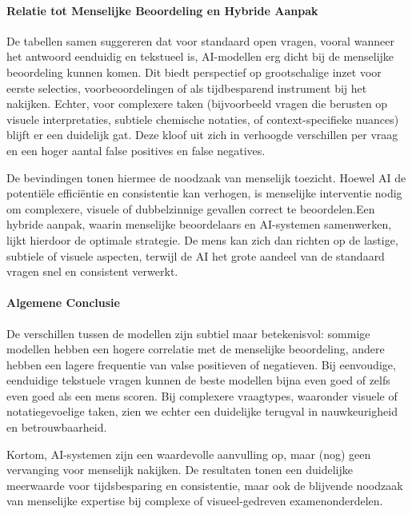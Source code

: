 \documentclass[12pt]{article}
\begin{document}
\begin{multicols}{2}
\paragraph{Relatie tot Menselijke Beoordeling en Hybride Aanpak}
De tabellen samen suggereren dat voor standaard open vragen, vooral wanneer het antwoord eenduidig en tekstueel is, AI-modellen erg dicht bij de menselijke beoordeling kunnen komen. Dit biedt perspectief op grootschalige inzet voor eerste selecties, voorbeoordelingen of als tijdbesparend instrument bij het nakijken. Echter, voor complexere taken (bijvoorbeeld vragen die berusten op visuele interpretaties, subtiele chemische notaties, of context-specifieke nuances) blijft er een duidelijk gat. Deze kloof uit zich in verhoogde verschillen per vraag en een hoger aantal false positives en false negatives.

De bevindingen tonen hiermee de noodzaak van menselijk toezicht. Hoewel AI de potentiële efficiëntie en consistentie kan verhogen, is menselijke interventie nodig om complexere, visuele of dubbelzinnige gevallen correct te beoordelen.Een hybride aanpak, waarin menselijke beoordelaars en AI-systemen samenwerken, lijkt hierdoor de optimale strategie. De mens kan zich dan richten op de lastige, subtiele of visuele aspecten, terwijl de AI het grote aandeel van de standaard vragen snel en consistent verwerkt.

\paragraph*{Algemene Conclusie}
De verschillen tussen de modellen zijn subtiel maar betekenisvol: sommige modellen hebben een hogere correlatie met de menselijke beoordeling, andere hebben een lagere frequentie van valse positieven of negatieven. Bij eenvoudige, eenduidige tekstuele vragen kunnen de beste modellen bijna even goed of zelfs even goed als een mens scoren. Bij complexere vraagtypes, waaronder visuele of notatiegevoelige taken, zien we echter een duidelijke terugval in nauwkeurigheid en betrouwbaarheid.

Kortom, AI-systemen zijn een waardevolle aanvulling op, maar (nog) geen vervanging voor menselijk nakijken. De resultaten tonen een duidelijke meerwaarde voor tijdsbesparing en consistentie, maar ook de blijvende noodzaak van menselijke expertise bij complexe of visueel-gedreven examenonderdelen.


\end{multicols}
\end{document}
